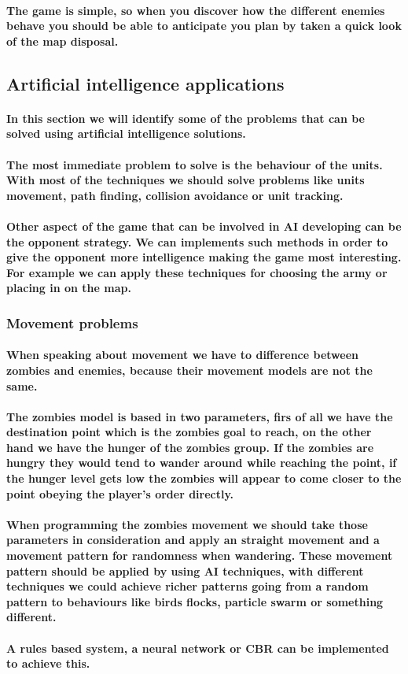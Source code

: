 \documentclass[a4paper,10pt]{article}
\newcommand{\p}[1]{\paragraph{\indent\textnormal{#1}}}
\begin{document}
    \p{The game is simple, so when you discover how the different enemies behave you should be able to anticipate you plan by taken a quick look of the map disposal.}

  \subsection{Artificial intelligence applications}

  \p{In this section we will identify some of the problems that can be solved using artificial intelligence solutions.}

  \p{The most immediate problem to solve is the behaviour of the units. With most of the techniques we should solve problems like units movement, path finding, collision avoidance or unit tracking.}

  \p{Other aspect of the game that can be involved in AI developing can be the opponent strategy. We can implements such methods in order to give the opponent more intelligence making the game most interesting. For example we can apply these techniques for choosing the army or placing in on the map.}

  \subsubsection{Movement problems}
    
    \p{When speaking about movement we have to difference between zombies and enemies, because their movement models are not the same.}

    \p{The zombies model is based in two parameters, firs of all we have the destination point which is the zombies goal to reach, on the other hand we have the hunger of the zombies group. If the zombies are hungry they would tend to wander around while reaching the point, if the hunger level gets low the zombies will appear to come closer to the point obeying the player's order directly.}

    \p{When programming the zombies movement we should take those parameters in consideration and apply an straight movement and a movement pattern for randomness when wandering. These movement pattern should be applied by using AI techniques, with different techniques we could achieve richer patterns going from a random pattern to behaviours like birds flocks, particle swarm or something different.}

    \p{A rules based system, a neural network or CBR can be implemented to achieve this.}
\end{document}
